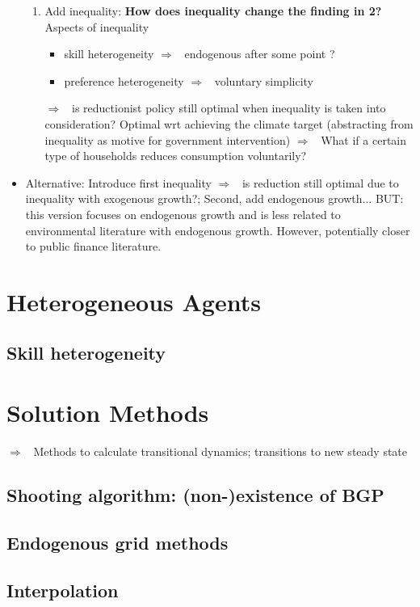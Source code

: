 \documentclass[12pt]{article}
\newcommand{\ar}{$\Rightarrow$ \ }
\begin{document}
\begin{itemize}
\begin{enumerate}
		\item Add inequality: \textbf{How does inequality change the finding in 2?} Aspects of inequality
		\begin{itemize}
			\item skill heterogeneity \ar endogenous after some point ?
			\item preference heterogeneity \ar voluntary simplicity
		\end{itemize}
		\ar is reductionist policy still optimal when inequality is taken into consideration? Optimal wrt achieving the climate target (abstracting from inequality as motive for government intervention)
		\ar What if a certain type of households reduces consumption voluntarily?
	\end{enumerate}
	\item Alternative: Introduce first inequality \ar is reduction still optimal due to inequality with exogenous growth?; Second, add endogenous growth... BUT: this version focuses on endogenous growth and is less related to environmental literature with endogenous growth. However, potentially closer to public finance literature.
\end{itemize}


\section{Heterogeneous Agents}
\subsection{Skill heterogeneity}
\hypertarget{skills}{}

\section{Solution Methods}
\ar Methods to calculate transitional dynamics; transitions to new steady state
\subsection{Shooting algorithm: (non-)existence of BGP}
\subsection{Endogenous grid methods}
\subsection{Interpolation}
\end{document}
